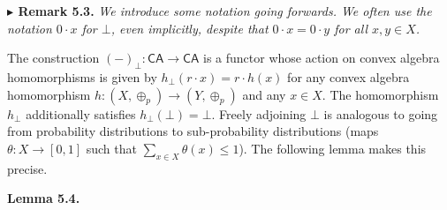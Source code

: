 \documentclass[11pt,a4paper]{amsart}
\begin{document}
\par\medskip
\hypertarget{html:S5.Thmtheorem3}{} \par\noindent\textbf{%
\hypertarget{html:S5.Thmtheorem3.m1}{}\({\blacktriangleright}\) Remark 5.3.}\quad  %
\hypertarget{html:S5.Thmtheorem3.p1}{} \emph{We introduce some notation going forwards. We often use the notation %
\hypertarget{html:S5.Thmtheorem3.p1.m1}{}\({0\cdot x}\) for %
\hypertarget{html:S5.Thmtheorem3.p1.m2}{}\({\bot}\), even implicitly, despite that %
\hypertarget{html:S5.Thmtheorem3.p1.m3}{}\({0\cdot x=0\cdot y}\) for all %
\hypertarget{html:S5.Thmtheorem3.p1.m4}{}\({x,y\in X}\).}
\par\medskip
\hypertarget{html:S5.SS0.SSS0.P0.SPx3.p2}{} The construction %
\hypertarget{html:S5.SS0.SSS0.P0.SPx3.p2.m1}{}\({(-)_{\bot}\colon\mathsf{CA}\to\mathsf{CA}}\) is a functor whose action on convex algebra homomorphisms is given by %
\hypertarget{html:S5.SS0.SSS0.P0.SPx3.p2.m2}{}\({h_{\bot}(r\cdot x)=r\cdot h(x)}\) for any convex algebra homomorphism %
\hypertarget{html:S5.SS0.SSS0.P0.SPx3.p2.m3}{}\({h\colon(X,\oplus_{p})\to(Y,\oplus_{p})}\) and any %
\hypertarget{html:S5.SS0.SSS0.P0.SPx3.p2.m4}{}\({x\in X}\). The homomorphism %
\hypertarget{html:S5.SS0.SSS0.P0.SPx3.p2.m5}{}\({h_{\bot}}\) additionally satisfies %
\hypertarget{html:S5.SS0.SSS0.P0.SPx3.p2.m6}{}\({h_{\bot}(\bot)=\bot}\). Freely adjoining %
\hypertarget{html:S5.SS0.SSS0.P0.SPx3.p2.m7}{}\({\bot}\) is analogous to going from probability distributions to sub-probability distributions (maps %
\hypertarget{html:S5.SS0.SSS0.P0.SPx3.p2.m8}{}\({\theta\colon X\to[0,1]}\) such that %
\hypertarget{html:S5.SS0.SSS0.P0.SPx3.p2.m9}{}\({\sum_{x\in X}\theta(x)\leq 1}\)). The following lemma makes this precise.
\par\medskip
\hypertarget{html:S5.Thmtheorem4}{} \par\noindent\textbf{\textbf{Lemma 5.4}\textbf{.}}\quad  %
\end{document}
